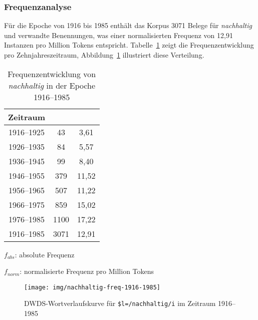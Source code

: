 \documentclass[
    german,
    a4paper,%
    12pt,%
    oneside,%
    toc=bibliography,
    final,
]{scrartcl}
\begin{document}
\subsubsection{Frequenzanalyse}

Für die Epoche von 1916 bis 1985 enthält das Korpus 3071 Belege für \textit{nachhaltig} und verwandte Benennungen, was einer normalisierten Frequenz von 12,91 Instanzen pro Million Tokens entspricht. Tabelle~\ref{tab:freq-epoche3} zeigt die Frequenzentwicklung pro Zehnjahreszeitraum, Abbildung~\ref{fig:nachhaltig-freq-1916-1985} illustriert diese Verteilung.

\begin{table}[h!]
	\centering
	\renewcommand{\arraystretch}{1.5}
	
	\caption{Frequenzentwicklung von \textit{nachhaltig} in der Epoche 1916–1985}
	\label{tab:freq-epoche3}
	
	\begin{threeparttable}
	
	\begin{tabular}{ccc}
	\textbf{Zeitraum} & \boldmath{$f_{abs}$} & \boldmath{$f_{norm}$} \\ \hline
	1916–1925 & 43 & 3,61 \\ \hline
	1926–1935 & 84 & 5,57 \\ \hline
	1936–1945 & 99 & 8,40 \\ \hline
	1946–1955 & 379 & 11,52 \\ \hline
	1956–1965 & 507 & 11,22 \\ \hline
	1966–1975 & 859 & 15,02 \\ \hline
	1976–1985 & 1100 & 17,22 \\ \hline\hline
	1916–1985 & 3071 & 12,91 \\ \hline
	\end{tabular} 
	
	\begin{tablenotes}
	\footnotesize
	\setlength{\itemindent}{-1.2em}
	\item $f_{abs}$: absolute Frequenz
	\item $f_{norm}$: normalisierte Frequenz pro Million Tokens
	\end{tablenotes}
	
	\end{threeparttable}
\end{table}

\begin{figure}[h!]
	\centering
	
	\texttt{[image: img/nachhaltig-freq-1916-1985]}
	\caption[corpus-size]{DWDS-Wortverlaufskurve für \lstinline|$l=/nachhaltig/i| im Zeitraum 1916–1985\protect\footnotemark}
	\label{fig:nachhaltig-freq-1916-1985}
\end{figure}
\end{document}
